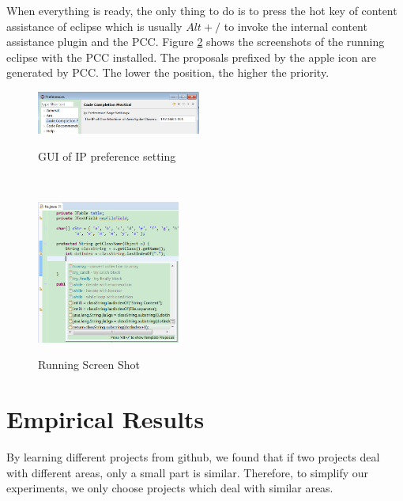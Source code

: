 \documentclass{sig-alternate-05-2015}
\begin{document}
When everything is ready, the only thing to do is to press the hot key of content assistance of eclipse which is usually $Alt+/$ to invoke the internal content assistance plugin and the PCC. Figure \ref{codecomprunexample} shows the screenshots of the running eclipse with the PCC installed. The proposals prefixed by the apple icon are generated by PCC. The lower the position, the higher the priority.
\vspace{-0.2cm}
\\\begin{figure}[htbp]
  \centering
  \includegraphics[width=0.48\textwidth]{pics/preferencesetting.png}\\
  \vspace{-0.2cm}
  \caption{GUI of IP preference setting}\label{GUIpreference}
\end{figure}
\vspace{-0.5cm}
\\\begin{figure}[htbp]
  \centering
  \includegraphics[width=0.42\textwidth]{pics/codecomprunexample.png}\\
  \vspace{-0.2cm}
  \caption{Running Screen Shot}\label{codecomprunexample}
\end{figure}
\vspace{-0.1cm}

\section{Empirical Results}

By learning different projects from github, we found that if two projects deal with different areas, only a small part is similar. Therefore, to simplify our experiments, we only choose projects which deal with similar areas.
\end{document}
